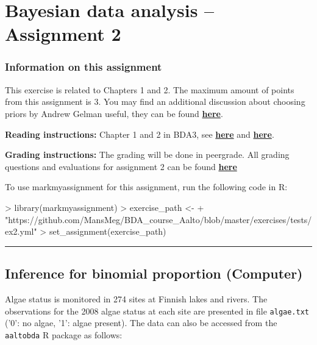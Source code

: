 \documentclass[a4paper,11pt]{article}
\newcommand{\HRule}{\rule{\linewidth}{0.5mm}}
\begin{document}

\thispagestyle{empty}

\section*{Bayesian data analysis -- Assignment 2}




\subsubsection*{Information on this assignment}

This exercise is related to Chapters 1 and 2. The maximum amount of points from this assignment is 3. You may find an additional discussion about choosing priors by Andrew Gelman useful, they can be found \href{http://andrewgelman.com/2017/10/04/worry-rigged-priors/}{\textbf{here}}.

\textbf{Reading instructions:} Chapter 1 and 2 in BDA3, see \href{https://github.com/avehtari/BDA_course_Aalto/blob/master/chapter_notes/BDA_notes_ch1.pdf}{\textbf{here}} and \href{https://github.com/avehtari/BDA_course_Aalto/blob/master/chapter_notes/BDA_notes_ch2.pdf}{\textbf{here}}.

\textbf{Grading instructions:} The grading will be done in peergrade. All grading questions and evaluations for assignment 2 can be found \href{https://github.com/avehtari/BDA_course_Aalto/blob/master/exercises/ex1_rubric.md}{\textbf{here}}

To use markmyassignment for this assignment, run the following code in R:
\begin{Schunk}
\begin{Sinput}
> library(markmyassignment)
> exercise_path <- 
+   "https://github.com/MansMeg/BDA_course_Aalto/blob/master/exercises/tests/ex2.yml"
> set_assignment(exercise_path)
\end{Sinput}
\end{Schunk}


\HRule

\newpage

\subsection*{Inference for binomial proportion (Computer)}

Algae status is monitored in 274 sites at Finnish lakes and rivers.
The observations for the 2008 algae status at each site are presented
in file {\tt algae.txt} ('0': no algae, '1': algae present). The data
can also be accessed from the {\tt aaltobda} R package as follows:
\end{document}
